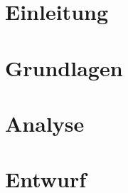 \documentclass[a4paper]{scrartcl}
\begin{document}
\newpage

%
%
\thispagestyle{empty}

\tableofcontents

\newpage

%
%

\setcounter{page}{3}

\section{Einleitung}


\section{Grundlagen}

\section{Analyse}

\section{Entwurf}

\end{document}
